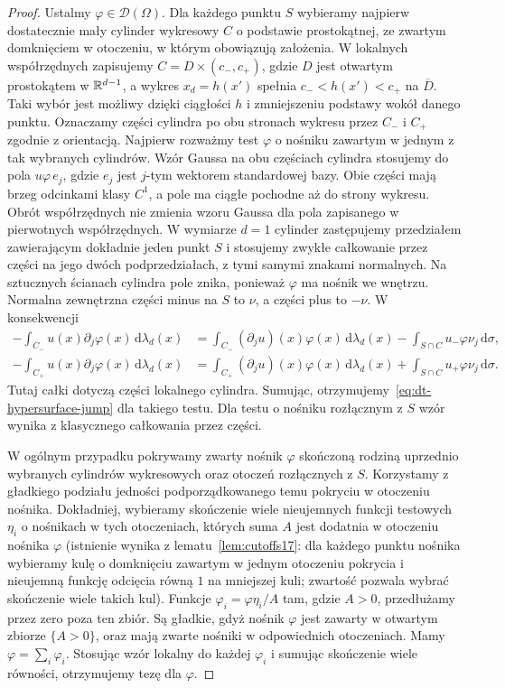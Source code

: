 \begin{proof}
Ustalmy $\varphi\in\mathcal D(\Omega)$.
Dla każdego punktu $S$ wybieramy najpierw
dostatecznie mały cylinder wykresowy $C$
o podstawie prostokątnej, ze zwartym domknięciem
w otoczeniu, w którym obowiązują założenia.
W lokalnych współrzędnych zapisujemy
$C=D\times(c_-,c_+)$, gdzie $D$ jest otwartym
prostokątem w $\mathbb R^{d-1}$, a wykres $x_d=h(x')$
spełnia $c_-<h(x')<c_+$ na $\overline D$.
Taki wybór jest możliwy dzięki ciągłości $h$
i zmniejszeniu podstawy wokół danego punktu.
Oznaczamy części cylindra po obu stronach
wykresu przez $C_-$ i $C_+$ zgodnie z orientacją.
Najpierw rozważmy test $\varphi$ o nośniku
zawartym w jednym z tak wybranych cylindrów.
Wzór Gaussa na obu częściach cylindra stosujemy
do pola $u\varphi\,e_j$, gdzie $e_j$ jest $j$-tym
wektorem standardowej bazy. Obie części mają
brzeg odcinkami klasy $C^1$, a pole ma ciągłe
pochodne aż do strony wykresu.
Obrót współrzędnych nie zmienia wzoru Gaussa
dla pola zapisanego w pierwotnych współrzędnych.
W wymiarze $d=1$ cylinder zastępujemy przedziałem
zawierającym dokładnie jeden punkt $S$ i stosujemy
zwykłe całkowanie przez części na jego dwóch
podprzedziałach, z tymi samymi znakami normalnych.
Na sztucznych ścianach cylindra pole znika,
ponieważ $\varphi$ ma nośnik we wnętrzu.
Normalna zewnętrzna części minus na $S$ to $\nu$,
a części plus to $-\nu$. W konsekwencji
\[
 \begin{aligned}
 -\int_{C_-}u(x)\partial_j\varphi(x)\,\mathrm d\lambda_d(x)
 &=\int_{C_-}(\partial_ju)(x)\varphi(x)\,\mathrm d\lambda_d(x)
   -\int_{S\cap C} u_-\varphi\nu_j\,\mathrm d\sigma,\\
 -\int_{C_+}u(x)\partial_j\varphi(x)\,\mathrm d\lambda_d(x)
 &=\int_{C_+}(\partial_ju)(x)\varphi(x)\,\mathrm d\lambda_d(x)
   +\int_{S\cap C} u_+\varphi\nu_j\,\mathrm d\sigma.
 \end{aligned}
\]
Tutaj całki dotyczą części lokalnego cylindra.
Sumując, otrzymujemy~\eqref{eq:dt-hypersurface-jump} dla takiego
testu. Dla testu o nośniku rozłącznym z $S$ wzór
wynika z klasycznego całkowania przez części.

W ogólnym przypadku pokrywamy zwarty nośnik
$\varphi$ skończoną rodziną uprzednio wybranych
cylindrów wykresowych oraz otoczeń rozłącznych
z $S$. Korzystamy z gładkiego
podziału jedności podporządkowanego temu pokryciu
w otoczeniu nośnika. Dokładniej, wybieramy skończenie
wiele nieujemnych funkcji testowych $\eta_i$
o nośnikach w tych otoczeniach, których suma $A$
jest dodatnia w otoczeniu nośnika $\varphi$
(istnienie wynika z lematu~\ref{lem:cutoffs17}:
dla każdego punktu nośnika wybieramy kulę o domknięciu
zawartym w jednym otoczeniu pokrycia i nieujemną funkcję
odcięcia równą $1$ na mniejszej kuli; zwartość pozwala
wybrać skończenie wiele takich kul).
Funkcje $\varphi_i=\varphi\eta_i/A$ tam, gdzie $A>0$,
przedłużamy przez zero poza ten zbiór.
Są gładkie, gdyż nośnik $\varphi$ jest zawarty
w otwartym zbiorze $\{A>0\}$, oraz mają zwarte
nośniki w odpowiednich otoczeniach.
Mamy $\varphi=\sum_i\varphi_i$. Stosując wzór
lokalny do każdej $\varphi_i$ i sumując skończenie
wiele równości, otrzymujemy tezę dla $\varphi$.
\end{proof}

